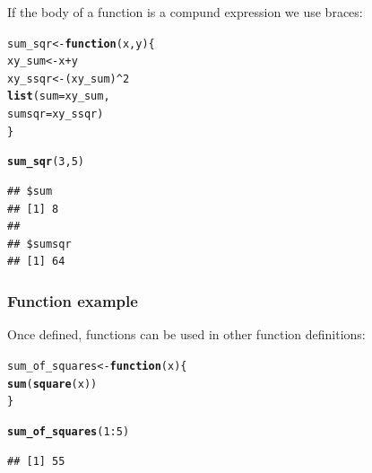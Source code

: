 \documentclass[12pt]{beamer}\usepackage[]{graphicx}\usepackage[]{color}
\makeatletter
\newcommand{\hlnum}[1]{\textcolor[rgb]{0.686,0.059,0.569}{#1}}%
\newcommand{\hlopt}[1]{\textcolor[rgb]{0,0,0}{#1}}%
\newcommand{\hlstd}[1]{\textcolor[rgb]{0.345,0.345,0.345}{#1}}%
\newcommand{\hlkwa}[1]{\textcolor[rgb]{0.161,0.373,0.58}{\textbf{#1}}}%
\newcommand{\hlkwb}[1]{\textcolor[rgb]{0.69,0.353,0.396}{#1}}%
\newcommand{\hlkwc}[1]{\textcolor[rgb]{0.333,0.667,0.333}{#1}}%
\newcommand{\hlkwd}[1]{\textcolor[rgb]{0.737,0.353,0.396}{\textbf{#1}}}%
\newenvironment{kframe}{%
 \def\at@end@of@kframe{}%
 \ifinner\ifhmode%
  \def\at@end@of@kframe{\end{minipage}}%
  \begin{minipage}{\columnwidth}%
 \fi\fi%
 \def\FrameCommand##1{\hskip\@totalleftmargin \hskip-\fboxsep
 \colorbox{shadecolor}{##1}\hskip-\fboxsep
     \hskip-\linewidth \hskip-\@totalleftmargin \hskip\columnwidth}%
 \MakeFramed {\advance\hsize-\width
   \@totalleftmargin\z@ \linewidth\hsize
   \@setminipage}}%
 {\par\unskip\endMakeFramed%
 \at@end@of@kframe}
\newenvironment{knitrout}{}{} %
\makeatother
\begin{document}

\begin{frame}[fragile]
\frametitle{}

If the body of a function is a compund expression we use braces:
\begin{knitrout}\footnotesize
{}\color{fgcolor}\begin{kframe}
\begin{alltt}
\hlstd{sum_sqr} \hlkwb{<-} \hlkwa{function}\hlstd{(}\hlkwc{x}\hlstd{,} \hlkwc{y}\hlstd{) \{}
  \hlstd{xy_sum} \hlkwb{<-} \hlstd{x} \hlopt{+} \hlstd{y}
  \hlstd{xy_ssqr} \hlkwb{<-} \hlstd{(xy_sum)}\hlopt{^}\hlnum{2}
  \hlkwd{list}\hlstd{(}\hlkwc{sum} \hlstd{= xy_sum,}
       \hlkwc{sumsqr} \hlstd{= xy_ssqr)}
\hlstd{\}}

\hlkwd{sum_sqr}\hlstd{(}\hlnum{3}\hlstd{,} \hlnum{5}\hlstd{)}
\end{alltt}
\begin{verbatim}
## $sum
## [1] 8
## 
## $sumsqr
## [1] 64
\end{verbatim}
\end{kframe}
\end{knitrout}

\end{frame}


\begin{frame}[fragile]
\frametitle{Function example}

Once defined, functions can be used in other function definitions:
\begin{knitrout}\footnotesize
{}\color{fgcolor}\begin{kframe}
\begin{alltt}
\hlstd{sum_of_squares} \hlkwb{<-} \hlkwa{function}\hlstd{(}\hlkwc{x}\hlstd{) \{}
  \hlkwd{sum}\hlstd{(}\hlkwd{square}\hlstd{(x))}
\hlstd{\}}

\hlkwd{sum_of_squares}\hlstd{(}\hlnum{1}\hlopt{:}\hlnum{5}\hlstd{)}
\end{alltt}
\begin{verbatim}
## [1] 55
\end{verbatim}
\end{kframe}
\end{knitrout}

\end{frame}

\end{document}
